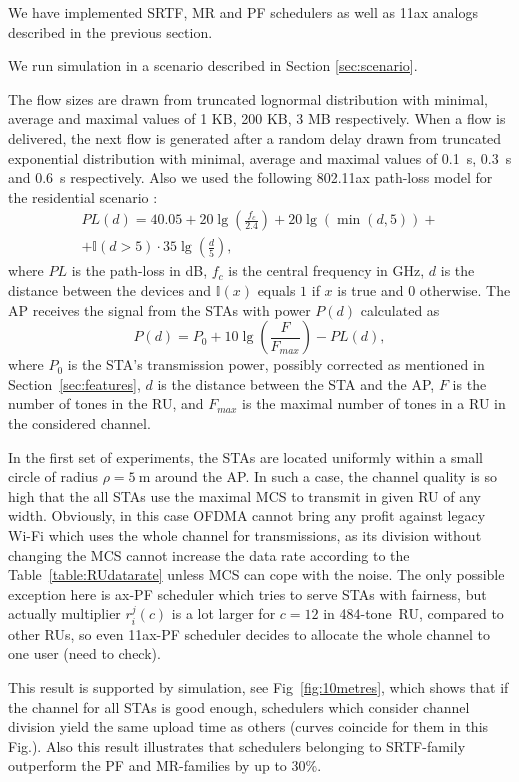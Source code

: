 We have implemented SRTF, MR and PF schedulers as well as 11ax analogs described in the previous section.

We run simulation in a scenario described in Section \ref{sec:scenario}.

The flow sizes are drawn from truncated lognormal distribution with minimal, average and maximal values of 1 KB, 200 KB, 3 MB respectively. 
When a flow is delivered, the next flow is generated after a random delay drawn from truncated exponential distribution with minimal, average and maximal values of \SI{0.1}{\s}, \SI{0.3}{\s} and \SI{0.6}{\s} respectively.
Also we used the following 802.11ax path-loss model for the residential scenario \cite{presentation_scenarios}:
\begin{multline*}
PL(d) = 40.05 + 20 \lg\left(\frac{f_c}{2.4}\right) + 20 \lg(\min(d, 5)) + \\
+ \mathbb{I}(d > 5) \cdot 35 \lg\left(\frac{d}{5}\right),
\end{multline*}
where $PL$ is the path-loss in dB, $f_c$ is the central frequency in GHz, $d$ is the distance between the devices and $\mathbb{I}{(x) }$ equals $1$ if $x$ is true and $0$ otherwise.
The AP receives the signal from the STAs with power $P(d)$ calculated as
$$
P(d) = P_0 + 10 \lg\left(\frac{F}{F_{max}}\right) - PL(d),
$$
where $P_0$ is the STA's transmission power, possibly corrected as mentioned in Section~\ref{sec:features}, $d$ is the distance between the STA and the AP, $F$ is the number of tones in the RU, and $F_{max}$ is the maximal number of tones in a RU in the considered channel.

In the first set of experiments, the STAs are located uniformly within a small circle of radius $\rho = \SI{5}{\m}$ around the AP.
In such a case, the channel quality is so high that the all STAs use the maximal MCS to transmit in given RU of any width.
Obviously, in this case OFDMA cannot bring any profit against legacy Wi-Fi which uses the whole channel for transmissions, as its division without changing the MCS cannot increase the data rate according to the Table~\ref{table:RUdatarate} unless MCS  can cope with the noise. The only possible exception here is ax-PF scheduler which tries to serve STAs with fairness, but actually multiplier $r^j_i (c)$ is a lot larger for $c=12$ in 484-tone~RU, compared to other RUs, so even 11ax-PF scheduler decides to allocate the whole channel to one user (need to check).

This result is supported by simulation, see Fig~\ref{fig:10metres}, which shows that if the channel for all STAs is good enough, schedulers which consider channel division yield the same upload time as others (curves coincide for them in this Fig.). Also this result illustrates that schedulers belonging to SRTF-family outperform the PF and MR-families by up to 30\%. 


